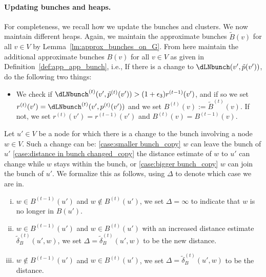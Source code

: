 \paragraph{Updating bunches and heaps.}
For completeness, we recall how we update the bunches and clusters. We now maintain different heaps. Again, we maintain the approximate bunches $\tilde B(v)$ for all $v\in V$ by Lemma~\ref{lm:approx_bunches_on_G}. From here maintain the additional approximate bunches $B(v)$ for all $v\in V$ as given in Definition~\ref{def:app_app_bunch}, i.e., 
If there is a change to $\dLNbunch(v',\tilde p(v'))$, do the following two things:
    \begin{itemize}
        \item We check if $\dLNbunch^{(t)}(v',\tilde p^{(t)}(v'))> (1+\epsilon_3)r^{(t-1)}(v')$, and if so we set $r^{(t)}(v')=\dLNbunch^{(t)}(v',p^{(t)}(v'))$ and we set $B^{(t)}(v):=\tilde B^{(t)}(v)$. If not, we set $r^{(t)}(v')=r^{(t-1)}(v')$ and $B^{(t)}(v)=B^{(t-1)}(v)$.
    \end{itemize}
 Let $u'\in V$ be a node for which there is a change to the bunch involving a node $w\in V$. Such a change can be: \ref{case:smaller bunch_copy} $w$ can leave the bunch of $u'$ \ref{case:distance in bunch changed_copy} the distance estimate of $w$ to $u'$ can change while $w$ stays within the bunch, or \ref{case:bigger bunch_copy} $w$ can join the bunch of $u'$. We formalize this as follows, using $\Delta$ to denote which case we are in.
    \begin{enumerate}[(i)]
        \item $w\in B^{(t-1)}(u')$ and $w\notin B^{(t)}(u')$, we set $\Delta=\infty$ to indicate that $w$ is no longer in $B(u')$. \label{case:smaller bunch_copy}
        \item $w\in B^{(t-1)}(u')$ and $w\in B^{(t)}(u')$ with an increased distance estimate $\tilde \delta_B^{(t)}(u',w)$, we set $\Delta=\tilde \delta_B^{(t)}(u',w)$ to be the new distance. \label{case:distance in bunch changed_copy}
        \item \label{case:bigger bunch_copy} $w\notin B^{(t-1)}(u')$ and $w\in B^{(t)}(u')$, we set $\Delta=\tilde \delta_B^{(t)}(u',w)$ to be the distance. 
    \end{enumerate}
        
    
    
